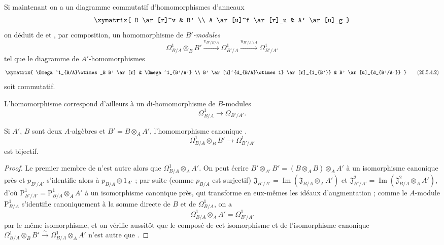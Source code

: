 \begin{env}[20.5.4]
\label{0.20.5.4-fr}
Si maintenant on a un diagramme commutatif d'homomorphismes d'anneaux
\[
\xymatrix{
  B \ar[r]^v & B' \\
  A \ar[u]^f \ar[r]_u & A' \ar[u]_g
}
\]
on déduit de  et , par composition,
un homomorphisme de \emph{$B'$-modules}
\begin{equation}
\tag{20.5.4.1}
\label{0.20.5.4.1-fr}
  \Omega^1_{B/A}\otimes_B B'
  \xrightarrow{v_{B'/B/A}}\Omega^1_{B'/A}
  \xrightarrow{u_{B'/A'/A}}\Omega^1_{B'/A'}
\end{equation}
tel que le diagramme de $A'$-homomorphismes
\[
\xymatrix{
  \Omega^1_{B/A}\otimes_B B' \ar[r] & \Omega^1_{B'/A'} \\
  B' \ar[u]^{d_{B/A}\otimes1} \ar[r]_{1_{B'}} &
  B' \ar[u]_{d_{B'/A'}}
}
\tag{20.5.4.2}
\label{0.20.5.4.2-fr}
\]
soit commutatif.

L'homomorphisme  correspond d'ailleurs à un
di-homomorphisme de $B$-modules
\begin{equation}
\tag{20.5.4.3}
\label{0.20.5.4.3-fr}
  \Omega^1_{B/A}\to\Omega_{B'/A'}.
\end{equation}
\end{env}

\begin{proposition}[20.5.5]
\label{0.20.5.5-fr}
Si $A'$, $B$ sont deux $A$-algèbres et $B'=B\otimes_A A'$,
l'homomorphisme canonique \textup{}.
\begin{equation}
\tag{20.5.5.1}
\label{0.20.5.5.1-fr}
  \Omega^1_{B/A}\otimes_B B'\to\Omega^1_{B'/A'}
\end{equation}
est bijectif.
\end{proposition}

\begin{proof}
Le premier membre de  n'est autre alors que
$\Omega^1_{B/A}\otimes_A A'$. On peut écrire
$B'\otimes_{A'}B'=(B\otimes_A B)\otimes_A A'$ à un isomorphisme canonique
près et $p_{B'/A'}$ s'identifie alors à
$p_{B/A}\otimes1_{A'}$ ; par suite (comme $p_{B/A}$ est surjectif)
$\mathfrak{J}_{B'/A'}=\operatorname{Im}(\mathfrak{J}_{B/A}\otimes_A A')$
et
$\mathfrak{J}^2_{B'/A'}
=\operatorname{Im}(\mathfrak{J}^2_{B/A}\otimes_A A')$, d'où
$\mathrm{P}^1_{B'/A'}=\mathrm{P}^1_{B/A}\otimes_A A'$ à un isomorphisme
canonique près, qui transforme en eux-mêmes les idéaux d'augmentation ;
comme le $A$-module $\mathrm{P}^1_{B/A}$ s'identifie canoniquement à la
somme directe de $B$ et de $\Omega^1_{B/A}$, on a
\begin{equation}
\tag{20.5.5.2}
\label{0.20.5.5.2-fr}
  \Omega^1_{B/A}\otimes_A A'=\Omega^1_{B'/A'}
\end{equation}
par le même isomorphisme, et on vérifie aussitôt que le composé de cet
isomorphisme et de l'isomorphisme canonique
$\Omega^1_{B/A}\otimes_B B'\xrightarrow{\sim}
\Omega^1_{B/A}\otimes_A A'$ n'est autre que .
\end{proof}

